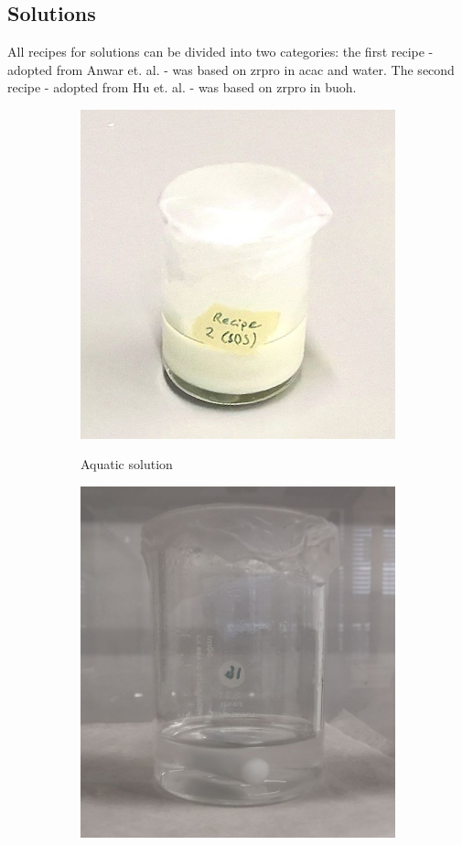 \subsection{Solutions}
All recipes for solutions can be divided into two categories:
the first recipe - adopted from Anwar et. al. \cite{Anwar2017} - was based on \gls{zrpro} in \gls{acac} and \gls{water}.
The second recipe - adopted from Hu et. al. \cite{Hu2016} - was based on \gls{zrpro} in \gls{buoh}.

\begin{figure}[htb]
	\centering
	\begin{subfigure}{0.49\textwidth}
		\centering
		\includegraphics[height=0.8\textwidth]{Pics/sol-aq.png}
		\label{fig:sol-aq}
		\caption{Aquatic solution}
	\end{subfigure}
	\begin{subfigure}{0.49\textwidth}
		\centering
		\includegraphics[height=0.8\textwidth]{Pics/sol-bu.png}

\end{subfigure}
\end{figure}

